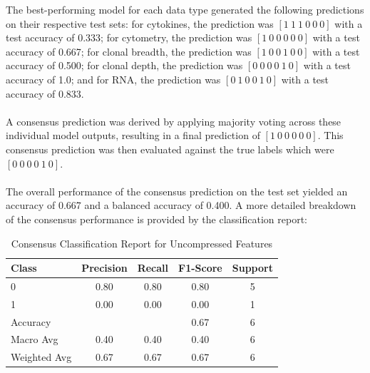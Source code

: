 \documentclass[12pt,a4paper]{report}
\begin{document}
\noindent
The best-performing model for each data type generated the following predictions on their respective test sets: for cytokines, the prediction was $[1\ 1\ 1\ 0\ 0\ 0]$ with a test accuracy of 0.333; for cytometry, the prediction was $[1\ 0\ 0\ 0\ 0\ 0]$ with a test accuracy of 0.667; for clonal breadth, the prediction was $[1\ 0\ 0\ 1\ 0\ 0]$ with a test accuracy of 0.500; for clonal depth, the prediction was $[0\ 0\ 0\ 0\ 1\ 0]$ with a test accuracy of 1.0; and for RNA, the prediction was $[0\ 1\ 0\ 0\ 1\ 0]$ with a test accuracy of 0.833.\\
\\
A consensus prediction was derived by applying majority voting across these individual model outputs, resulting in a final prediction of $[1\ 0\ 0\ 0\ 0\ 0]$. This consensus prediction was then evaluated against the true labels which were $[0\ 0\ 0\ 0\ 1\ 0]$.\\
\\
The overall performance of the consensus prediction on the test set yielded an accuracy of 0.667 and a balanced accuracy of 0.400. A more detailed breakdown of the consensus performance is provided by the classification report:
\begin{table}[h!]
    \centering
    \begin{tabular}{l c c c c}
        \toprule
        Class & Precision & Recall & F1-Score & Support \\
        \midrule
        0 & 0.80 & 0.80 & 0.80 & 5 \\
        1 & 0.00 & 0.00 & 0.00 & 1 \\
        \midrule
        Accuracy &       &      & 0.67 & 6 \\
        Macro Avg & 0.40 & 0.40 & 0.40 & 6 \\
        Weighted Avg & 0.67 & 0.67 & 0.67 & 6 \\
        \bottomrule
    \end{tabular}
    \caption[Consensus Classification Report Uncompressed Features]{Consensus Classification Report for Uncompressed Features}
    \label{tab:consensus_report_uncompressed}
\end{table}
\end{document}
